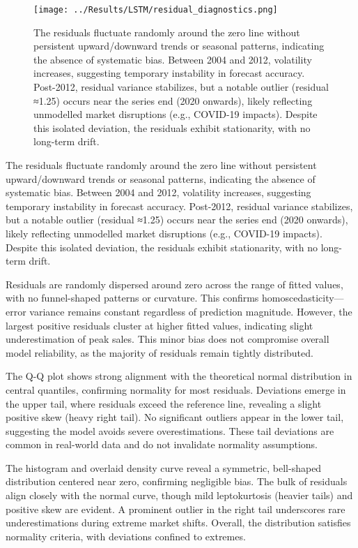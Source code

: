 \documentclass[12pt,a4paper]{report}
\begin{document}
\begin{figure}[htbp]
\centering
\texttt{[image: ../Results/LSTM/residual\_diagnostics.png]}
\caption{The residuals fluctuate randomly around the zero line without persistent upward/downward trends or seasonal patterns, indicating the absence of systematic bias. Between 2004 and 2012, volatility increases, suggesting temporary instability in forecast accuracy. Post-2012, residual variance stabilizes, but a notable outlier (residual ≈1.25) occurs near the series end (2020 onwards), likely reflecting unmodelled market disruptions (e.g., COVID-19 impacts). Despite this isolated deviation, the residuals exhibit stationarity, with no long-term drift.}
\label{fig:residual_diagnostics}
\end{figure}
The residuals fluctuate randomly around the zero line without persistent upward/downward trends or seasonal patterns, indicating the absence of systematic bias. Between 2004 and 2012, volatility increases, suggesting temporary instability in forecast accuracy. Post-2012, residual variance stabilizes, but a notable outlier (residual ≈1.25) occurs near the series end (2020 onwards), likely reflecting unmodelled market disruptions (e.g., COVID-19 impacts). Despite this isolated deviation, the residuals exhibit stationarity, with no long-term drift. 

Residuals are randomly dispersed around zero across the range of fitted values, with no funnel-shaped patterns or curvature. This confirms homoscedasticity—error variance remains constant regardless of prediction magnitude. However, the largest positive residuals cluster at higher fitted values, indicating slight underestimation of peak sales. This minor bias does not compromise overall model reliability, as the majority of residuals remain tightly distributed. 

The Q-Q plot shows strong alignment with the theoretical normal distribution in central quantiles, confirming normality for most residuals. Deviations emerge in the upper tail, where residuals exceed the reference line, revealing a slight positive skew (heavy right tail). No significant outliers appear in the lower tail, suggesting the model avoids severe overestimations. These tail deviations are common in real-world data and do not invalidate normality assumptions.

The histogram and overlaid density curve reveal a symmetric, bell-shaped distribution centered near zero, confirming negligible bias. The bulk of residuals align closely with the normal curve, though mild leptokurtosis (heavier tails) and positive skew are evident. A prominent outlier in the right tail underscores rare underestimations during extreme market shifts. Overall, the distribution satisfies normality criteria, with deviations confined to extremes.
\end{document}
